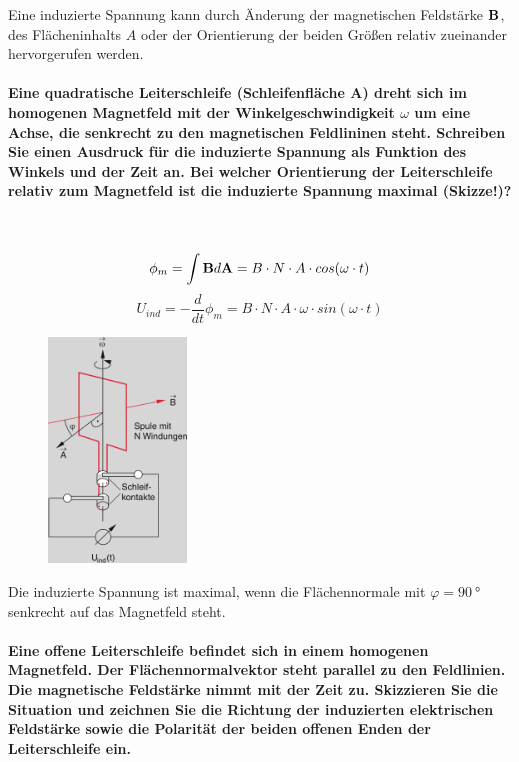 \documentclass[a4paper, 11pt, parskip=half]{scrartcl}
\begin{document}
Eine induzierte Spannung kann durch Änderung der magnetischen Feldstärke $\bold{B}$, des
Flächeninhalts $A$ oder der Orientierung der beiden Größen relativ zueinander hervorgerufen werden.

\paragraph{Eine quadratische Leiterschleife (Schleifenfläche A) dreht sich im homogenen Magnetfeld
mit der Winkelgeschwindigkeit $\omega$ um eine Achse, die senkrecht zu den magnetischen Feldlininen
steht. Schreiben Sie einen Ausdruck für die induzierte Spannung als Funktion des Winkels und der
Zeit an. Bei welcher Orientierung der Leiterschleife relativ zum Magnetfeld ist die induzierte
Spannung maximal (Skizze!)?} ~

\begin{equation}
    \phi_m = \int \bold{B} d\bold{A} = B \cdot N \cdot A \cdot cos(\omega \cdot t)
\end{equation}
\begin{equation}
    U_{ind} = - \frac{d}{dt} \phi_m = B \cdot N \cdot A \cdot \omega \cdot sin(\omega \cdot t)
\end{equation}

\begin{figure}[H]
    \centering
    \includegraphics[height=6cm]{image/7/2.1}
\end{figure}

Die induzierte Spannung ist maximal, wenn die Flächennormale mit $\varphi = \SI{90}{\degree}$
senkrecht auf das Magnetfeld steht.

\paragraph{Eine offene Leiterschleife befindet sich in einem homogenen Magnetfeld. Der
Flächennormalvektor steht parallel zu den Feldlinien. Die magnetische Feldstärke nimmt mit der Zeit
zu. Skizzieren Sie die Situation und zeichnen Sie die Richtung der induzierten elektrischen
Feldstärke sowie die Polarität der beiden offenen Enden der Leiterschleife ein.} ~
\end{document}
